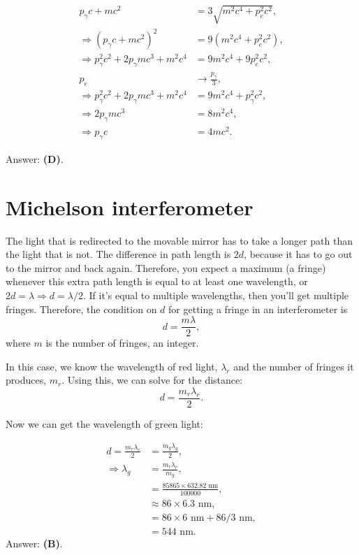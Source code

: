 \documentclass[11pt]{paper}
\newcommand{\answer}[1]{Answer: \textbf{(#1)}.}
\begin{document}
\begin{align}
	p_\gamma c + mc^2 &= 3\sqrt{m^2c^4 + p_e^2c^2},\\
	\Rightarrow \left(p_\gamma c+mc^2\right)^2 &= 9\left(m^2c^4 + p_e^2c^2\right),\\
	\Rightarrow p_\gamma^2c^2 + 2p_\gamma mc^3 + m^2c^4 &= 9m^2c^4 + 9p_e^2c^2,\\
	p_e &\rightarrow\frac{p_\gamma}{3},\\
	\Rightarrow p_\gamma^2c^2 + 2p_\gamma mc^3 + m^2c^4 &= 9m^2c^4 + p_\gamma^2 c^2,\\
	\Rightarrow 2p_\gamma mc^3 &= 8m^2c^4,\\
	\Rightarrow p_\gamma c &= 4mc^2.
\end{align}

\answer{D}

\section{Michelson interferometer}
The light that is redirected to the movable mirror has to take a longer path than the light that is not.  The difference in path length is $2d$, because it has to go out to the mirror and back again.  Therefore, you expect a maximum (a fringe) whenever this extra path length is equal to at least one wavelength, or $2d = \lambda \Rightarrow d=\lambda/2$.  If it's equal to multiple wavelengths, then you'll get multiple fringes.  Therefore, the condition on $d$ for getting a fringe in an interferometer is
\begin{equation}
	d = \frac{m\lambda}{2},
\end{equation}
where $m$ is the number of fringes, an integer.

In this case, we know the wavelength of red light, $\lambda_r$ and the number of fringes it produces, $m_r$.  Using this, we can solve for the distance:
\begin{equation}
	d = \frac{m_r\lambda_r}{2}.
\end{equation}

Now we can get the wavelength of green light:

\begin{align}
	d = \frac{m_r\lambda_r}{2} &= \frac{m_g\lambda_g}{2},\\
	\Rightarrow \lambda_g &= \frac{m_r\lambda_r}{m_g},\\
	&= \frac{85865 \times 632.82 \text{ nm}}{100000},\\
	&\approx 86 \times 6.3\text{ nm},\\
	&= 86\times6\text{ nm} + 86/3\text{ nm},\\
	&= 544\text{ nm}.
\end{align}
\answer{B}
\end{document}
